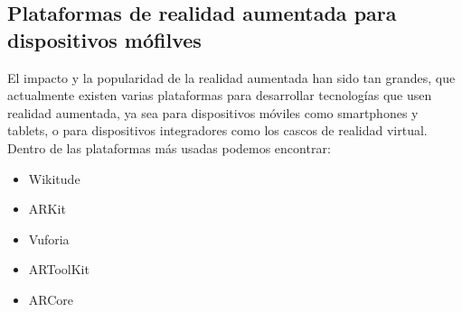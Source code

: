 \subsection{Plataformas de realidad aumentada para dispositivos mófilves}
El impacto y la popularidad de la realidad aumentada han sido tan grandes, que actualmente existen varias plataformas para desarrollar tecnologías que usen realidad aumentada, ya sea para dispositivos móviles como smartphones y tablets, o para dispositivos integradores como los cascos de realidad virtual. Dentro de las plataformas más usadas podemos encontrar:
\begin{itemize}
	\item Wikitude
	\item ARKit
	\item Vuforia
	\item ARToolKit
	\item ARCore
\end{itemize}


